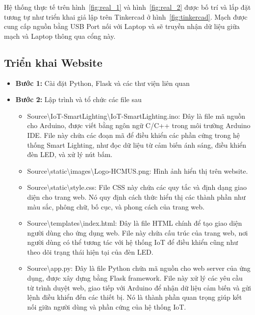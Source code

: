 {Hệ thống thực tế trên hình~\ref{fig:real_1} và hình~\ref{fig:real_2} được bố trí và lắp đặt tương tự như triển khai giả lập trên Tinkercad ở hình~\ref{fig:tinkercad}. Mạch được cung cấp nguồn bằng USB Port nối với Laptop và sẽ truyền nhận dữ liệu giữa mạch và Laptop thông qua cổng này. 


\pagebreak
\subsection{Triển khai Website}

{
\centering
\small
{}
}
\begin{itemize}
    \item \textbf{Bước 1:} Cài đặt Python, Flask và các thư viện liên quan
    \item \textbf{Bước 2:} Lập trình và tổ chức các file sau

    \begin{itemize}
        \item Source\textbackslash IoT-SmartLighting\textbackslash IoT-SmartLighting.ino: Đây là file mã nguồn cho Arduino, được viết bằng ngôn ngữ C/C++ trong môi trường Arduino IDE. File này chứa các đoạn mã để điều khiển các phần cứng trong hệ thống Smart Lighting, như đọc dữ liệu từ cảm biến ánh sáng, điều khiển đèn LED, và xử lý nút bấm.
        \item Source\textbackslash static\textbackslash images\textbackslash Logo-HCMUS.png: Hình ảnh hiển thị trên website. 
        \item Source\textbackslash static\textbackslash style.css: File CSS này chứa các quy tắc và định dạng giao diện cho trang web. Nó quy định cách thức hiển thị các thành phần như màu sắc, phông chữ, bố cục, và phong cách của trang web.
        \item Source\textbackslash templates\textbackslash index.html: Đây là file HTML chính để tạo giao diện người dùng cho ứng dụng web. File này chứa cấu trúc của trang web, nơi người dùng có thể tương tác với hệ thống IoT để điều khiển cũng như theo dõi trạng thái hiện tại của đèn LED. 
        \item Source\textbackslash app.py: Đây là file Python chứa mã nguồn cho web server của ứng dụng, được xây dựng bằng Flask framework. File này xử lý các yêu cầu từ trình duyệt web, giao tiếp với Arduino để nhận dữ liệu cảm biến và gửi lệnh điều khiển đến các thiết bị. Nó là thành phần quan trọng giúp kết nối giữa người dùng và phần cứng của hệ thống IoT.
    \end{itemize}


\end{itemize}}
